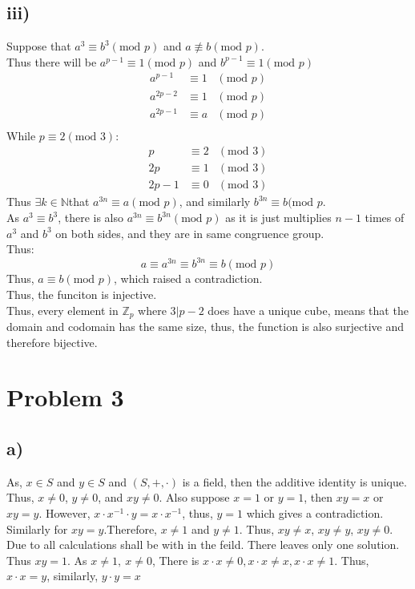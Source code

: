 \documentclass{article}
\begin{document}
\subsection*{iii)}
Suppose that \(a^3\equiv b^3 (\text{mod }p)\) and \(a\not\equiv b (\text{mod }p)\).\\
Thus there will be \(a^{p-1}\equiv 1 (\text{mod }p )\) and \(b^{p-1}\equiv 1(\text{mod }p)\)
\begin{align*}
    a^{p-1}&\equiv 1 &(\text{mod }p)\\
    a^{2p-2}&\equiv 1 &(\text{mod }p)\\
    a^{2p-1}&\equiv a &(\text{mod }p)\\
\end{align*}
While \(p\equiv 2 (\text{mod }3)\):
\begin{align*}
    p&\equiv 2 &(\text{mod }3)\\
    2p&\equiv 1 &(\text{mod }3)\\
    2p-1&\equiv 0 &(\text{mod }3)
\end{align*}
Thus \(\exists k\in \mathbb{N}\)that \(a^{3n} \equiv a (\text{mod }p)\), and similarly \(b^{3n} \equiv b (\text{mod }p\).\\
As \(a^3\equiv b^3\), there is also \(a^{3n}\equiv b^{3n} (\text{mod }p)\) as it is just multiplies \(n-1\) times of \(a^3\) and \(b^3\) on both sides, and they are in same congruence group.
\\ Thus:
\[a \equiv a^{3n} \equiv b^{3n} \equiv b (\text{mod }p)\]
Thus, \(a\equiv b (\text{mod }p)\), which raised a contradiction. \\
Thus, the funciton is injective.\\
Thus, every element in \(\mathbb{Z}_p\) where \(3|p-2\) does have a unique cube, means that the domain and codomain has the same size, thus, the function is also surjective and therefore bijective. 
\newpage
\section*{Problem 3}
\subsection*{a)}
As, \(x\in S\) and \(y \in S\) and \((S,+,\cdot)\) is a field, then the additive identity is unique.
Thus, \(x\neq 0\), \(y\neq 0\), and \(xy\neq 0\). Also suppose \(x=1\) or \(y=1\), then \(xy=x\) or \(xy=y\).
However, \(x\cdot x^{-1}\cdot y = x\cdot x^{-1}\), thus, \(y=1\) which gives a contradiction. Similarly for \(xy=y\).Therefore, \(x\neq1\) and \(y\neq 1\).
Thus, \(xy\neq x\), \(xy\neq y\), \(xy\neq 0\). Due to all calculations shall be with in the feild. There leaves only one solution. Thus
\(xy = 1\). As \(x\neq1,\ x\neq 0\), There is \(x\cdot x \neq 0, x\cdot x \neq x, x\cdot x \neq 1\). Thus, \(x\cdot x = y\), similarly, \(y\cdot y = x\)
\end{document}
